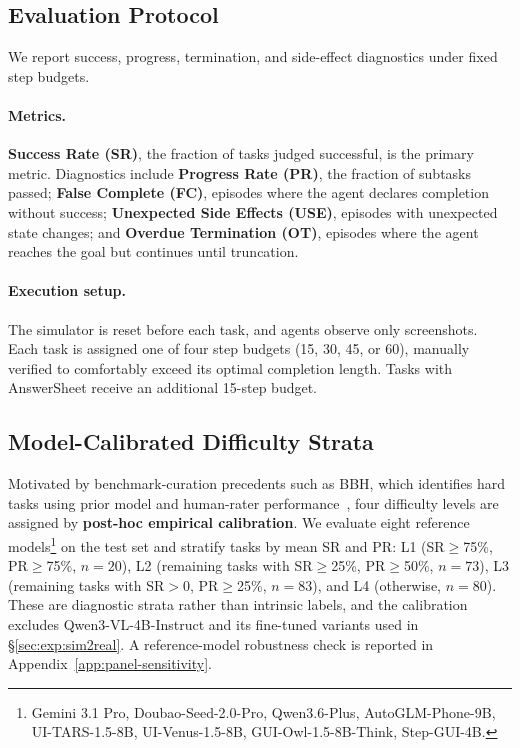 \documentclass{llmxive}
\begin{document}
\subsection{Evaluation Protocol}\label{sec:bench:eval}

We report success, progress, termination, and side-effect diagnostics under fixed step budgets.

\paragraph{Metrics.} \textbf{Success Rate (SR)}, the fraction of tasks judged successful, is the primary metric. Diagnostics include \textbf{Progress Rate (PR)}, the fraction of subtasks passed; \textbf{False Complete (FC)}, episodes where the agent declares completion without success; \textbf{Unexpected Side Effects (USE)}, episodes with unexpected state changes; and \textbf{Overdue Termination (OT)}, episodes where the agent reaches the goal but continues until truncation.

\paragraph{Execution setup.} The simulator is reset before each task, and agents observe only screenshots. Each task is assigned one of four step budgets (15, 30, 45, or 60), manually verified to comfortably exceed its optimal completion length. Tasks with AnswerSheet receive an additional 15-step budget.

\subsection{Model-Calibrated Difficulty Strata}\label{sec:bench:difficulty}

Motivated by benchmark-curation precedents such as BBH, which identifies hard tasks using prior model and human-rater performance~\cite{BBH}, four difficulty levels are assigned by \textbf{post-hoc empirical calibration}. We evaluate eight reference models\footnote{Gemini 3.1 Pro, Doubao-Seed-2.0-Pro, Qwen3.6-Plus, AutoGLM-Phone-9B, UI-TARS-1.5-8B, UI-Venus-1.5-8B, GUI-Owl-1.5-8B-Think, Step-GUI-4B.} on the test set and stratify tasks by mean SR and PR: L1 (SR${\geq}$75\%, PR${\geq}$75\%, $n{=}20$), L2 (remaining tasks with SR${\geq}$25\%, PR${\geq}$50\%, $n{=}73$), L3 (remaining tasks with SR${>}$0, PR${\geq}$25\%, $n{=}83$), and L4 (otherwise, $n{=}80$). These are diagnostic strata rather than intrinsic labels, and the calibration excludes Qwen3-VL-4B-Instruct and its fine-tuned variants used in §\ref{sec:exp:sim2real}. A reference-model robustness check is reported in Appendix~\ref{app:panel-sensitivity}.
\end{document}
